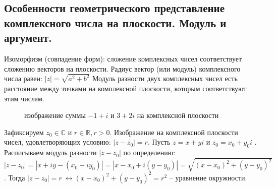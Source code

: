 \documentclass[a4paper,14pt]{article}
\DeclareMathOperator{\realpart}{\mathop{Re}}	%
\DeclareMathOperator{\imgpart}{\mathop{Im}} 	%
\begin{document}
\subsection{Особенности геометрического представление комплексного числа на плоскости. Модуль и аргумент.}
Изоморфизм (совпадение форм): сложение комплексных чисел соответствует сложению векторов на плоскости.
Радиус вектор (или модуль) комплексного числа равен: $\left|z\right|=\sqrt{a^2+b^2}$
Модуль разности двух комплексных чисел есть расстояние между точками на комплексной плоскости, которым соответствуют этим числам.
\begin{figure}[!htbp]
	\begin{center}
	\end{center} \caption{изображение суммы $-1+i$ и $3+2i$ на комплексной плоскости}
\end{figure}
Зафиксируем $z_0 \in \mathbb{C} \text{ и } r \in \mathbb{R}, r>0$. Изображение на комплексной плоскости чисел, удовлетворяющих условию: $\left|z-z_0\right|=r$.
\noindent Пусть $z=x+yi $ и $z_0=x_0+y_0i$ . Расписываем модуль разности $\left|z-z_0\right|$ по определению: $\left|z-z_0\right|=\left|x+iy-\left(x_0+iy_0\right)\right|=\left|x-x_0+i\left(y-y_0\right)\right|=\sqrt{\left(x-x_0\right)^2+\left(y-y_0\right)^2}$. Тогда $\left|z-z_0\right|=r\ \leftrightarrow\left(x-x_0\right)^2+\left(y-y_0\right)^2=r^2$ – уравнение окружности.
\end{document}
